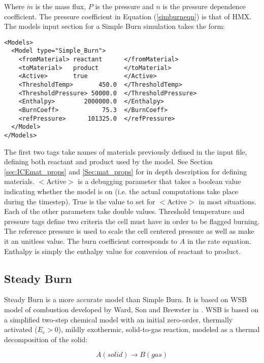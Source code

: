 Where $\dot{m}$ is the mass flux, $P$ is the pressure and $n$ is the pressure dependence coefficient.  The pressure coefficient in Equation (\ref{simburneqn}) is that of HMX.  The models input section for a Simple Burn simulation takes the form: 

\begin{lstlisting}
<Models>
  <Model type="Simple_Burn">
    <fromMaterial> reactant      </fromMaterial>
    <toMaterial>   product       </toMaterial>
    <Active>       true          </Active>
    <ThresholdTemp>       450.0  </ThresholdTemp>
    <ThresholdPressure> 50000.0  </ThresholdPressure>
    <Enthalpy>        2000000.0  </Enthalpy>
    <BurnCoeff>            75.3  </BurnCoeff>
    <refPressure>      101325.0  </refPressure>
  </Model>
</Models>
\end{lstlisting}

The first two tags take names of materials previously defined in the input file, defining both reactant and product used by the model.  See Section \ref{sec:ICEmat_props} and \ref{Sec:mat_props} for in depth description for defining materials.  $<$Active$>$ is a debugging parameter that takes a boolean value indicating whether the model is on (i.e. the actual computations take place during the timestep).  True is the value to set for $<$Active$>$ in most situations.  Each of the other parameters take double values.  Threshold temperature and pressure tags define two criteria the cell must have in order to be flagged burning.  The reference pressure is used to scale the cell centered pressure as well as make it an unitless value.  The burn coefficient corresponds to $A$ in the rate equation.  Enthalpy is simply the enthalpy value for conversion of reactant to product.
\newpage
\subsection{Steady Burn} \label{Sec:SteadyBurn}

Steady Burn is a more accurate model than Simple Burn.  It is based on WSB model of combustion developed by Ward, Son and Brewster in \cite{ref:wardsonbrewster}.  WSB is based on a simplified two-step chemical model with an initial zero-order, thermally activated ($E_c > 0$), mildly exothermic, solid-to-gas reaction, modeled as a thermal decomposition of the solid:

\begin{equation}
A(solid)\rightarrow B(gas)
\end{equation}


